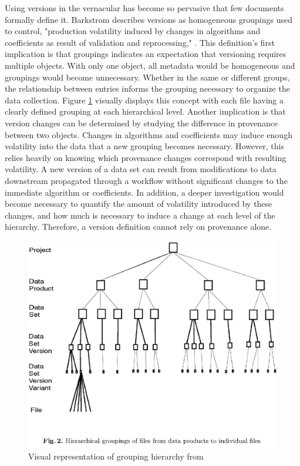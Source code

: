 Using versions in the vernacular has become so pervasive that few documents formally define it.
Barkstrom describes versions as homogeneous groupings used to control, "production volatility induced by changes in algorithms and coefficients as result of validation and reprocessing," \cite{Barkstrom2003}.
This definition's first implication is that groupings indicates an expectation that versioning requires multiple objects.
With only one object, all metadata would be homogeneous and groupings would become unnecessary.
Whether in the same or different groups, the relationship between entries informs the grouping necessary to organize the data collection.
Figure \ref{hierarchy} visually displays this concept with each file having a clearly defined grouping at each hierarchical level.
Another implication is that version changes can be determined by studying the difference in provenance between two objects.
Changes in algorithms and coefficients may induce enough volatility into the data that a new grouping becomes necessary.
However, this relies heavily on knowing which provenance changes correspond with resulting volatility.
A new version of a data set can result from modifications to data downstream propagated through a workflow without significant changes to the immediate algorithm or coefficients.
In addition, a deeper investigation would become necessary to quantify the amount of volatility introduced by these changes, and how much is necessary to induce a change at each level of the hierarchy.
Therefore, a version definition cannot rely on provenance alone.

\begin{figure}
	\centering
	\includegraphics[scale=0.50]{figures/hierarchy.png}
	\caption{Visual representation of grouping hierarchy from \cite{Barkstrom2003}}
	\label{hierarchy}
\end{figure}

